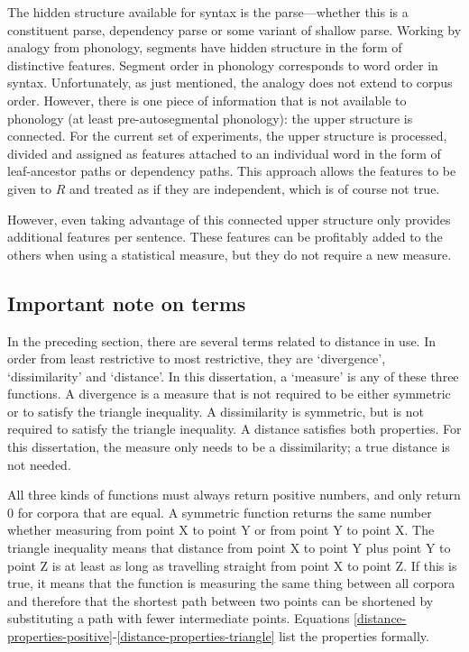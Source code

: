 The hidden structure available for syntax is the parse---whether this
is a constituent parse, dependency parse or some variant of shallow
parse. Working by analogy from phonology, segments have hidden
structure in the form of distinctive features. Segment order in
phonology corresponds to word order in syntax. Unfortunately, as just
mentioned, the analogy does not extend to corpus order. However, there
is one piece of information that is not available to phonology (at
least pre-autosegmental phonology): the upper structure is
connected. For the current set of experiments, the upper structure is
processed, divided and assigned as features attached to an individual
word in the form of leaf-ancestor paths or dependency paths. This
approach allows the features to be given to $R$ and treated as if they
are independent, which is of course not true.

However, even taking advantage of this connected upper structure only
provides additional features per sentence. These features can be
profitably added to the others when using a statistical measure, but
they do not require a new measure.

\subsection{Important note on terms}

In the preceding section, there are several terms related to distance
in use. In order from least restrictive to most restrictive, they are
`divergence', `dissimilarity' and `distance'. In this dissertation, a
`measure' is any of these three functions. A divergence is a measure
that is not required to be either symmetric or to satisfy the triangle
inequality. A dissimilarity is symmetric, but is not required to
satisfy the triangle inequality. A distance satisfies both
properties. For this dissertation, the measure only needs to be a
dissimilarity; a true distance is not needed.

All three kinds of functions must always return positive numbers, and
only return 0 for corpora that are equal.  A symmetric function
returns the same number whether measuring from point X to point Y or
from point Y to point X. The triangle inequality means that distance
from point X to point Y plus point Y to point Z is at least as long as
travelling straight from point X to point Z.  If this is true, it
means that the function is measuring the same thing between all
corpora and therefore that the shortest path between two points can be
shortened by substituting a path with fewer intermediate
points. Equations
\ref{distance-properties-positive}-\ref{distance-properties-triangle}
list the properties formally.

